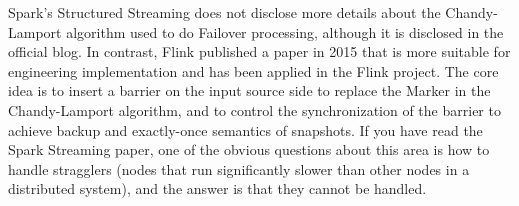 \documentclass[acmlarge]{acmart}
\begin{document}
Spark's \cite{zaharia2010spark} Structured Streaming does not disclose more details about the Chandy-Lamport algorithm used to do Failover processing, although it is disclosed in the official blog. In contrast, Flink published a paper in 2015 \cite{carbone2015lightweight} that is more suitable for engineering implementation and has been applied in the Flink project. The core idea is to insert a barrier on the input source side to replace the Marker in the Chandy-Lamport algorithm, and to control the synchronization of the barrier to achieve backup and exactly-once semantics of snapshots. If you have read the Spark Streaming paper, one of the obvious questions about this area is how to handle stragglers (nodes that run significantly slower than other nodes in a distributed system), and the answer is that they cannot be handled.



\end{document}
